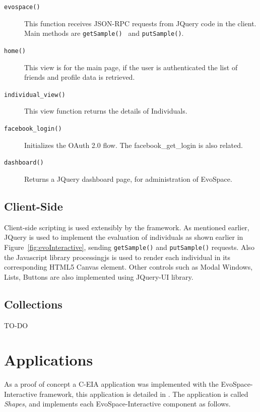 \documentclass{sig-alternate}
\begin{document}
\begin{description}

\item[\texttt{evospace()}] This function receives JSON-RPC requests from JQuery code in the client. Main methods are \texttt{getSample() } and \texttt{putSample()}.
\item[\texttt{home()}] This view is for the main page, if the user is authenticated the list of friends and profile data is retrieved.
\item [\texttt{individual\_view()}] This view function returns the details of Individuals.
\item [\texttt{facebook\_login()}] Initializes the OAuth 2.0 flow. The facebook\_get\_login is also related.
\item [\texttt{dashboard()}] Returns a JQuery dashboard page, for administration of EvoSpace.
\end{description}

\subsection{Client-Side}
Client-side scripting is used extensibly by the framework. As mentioned earlier, JQuery is used to implement the evaluation of individuals as shown earlier in Figure~\ref{fig:evoInteractive}, sending \texttt{getSample()} and \texttt{putSample()} requests.  Also the Javascript library processingjs is used to render each individual in its corresponding HTML5 Canvas element. Other controls such as Modal Windows, Lists, Buttons are also implemented using JQuery-UI library.

\subsection{Collections}
TO-DO
\section{Applications}
\label{sec:apps}
As a proof of concept a C-EIA application was implemented with the EvoSpace-Interactive framework, this application is detailed in \cite{Musart}. The application is called \emph{Shapes}, and implements each EvoSpace-Interactive component as follows.
\end{document}

